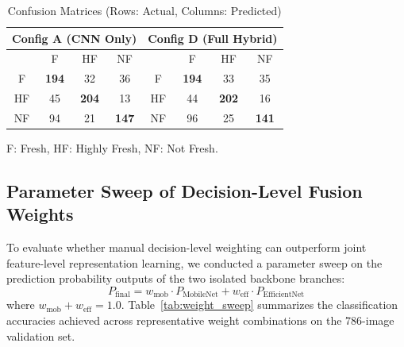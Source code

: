 \documentclass[conference]{IEEEtran}
\begin{document}
\begin{table}[h]
\centering
\caption{Confusion Matrices (Rows: Actual, Columns: Predicted)}
\label{tab:confusion}
\begin{tabular}{c|ccc|c|ccc}
\toprule
\multicolumn{4}{c|}{\textbf{Config A (CNN Only)}} & \multicolumn{4}{c}{\textbf{Config D (Full Hybrid)}} \\
\midrule
& F & HF & NF & & F & HF & NF \\
\midrule
F & \textbf{194} & 32 & 36 & F & \textbf{194} & 33 & 35 \\
HF & 45 & \textbf{204} & 13 & HF & 44 & \textbf{202} & 16 \\
NF & 94 & 21 & \textbf{147} & NF & 96 & 25 & \textbf{141} \\
\bottomrule
\end{tabular}
\vspace{0.1cm}

\scriptsize{F: Fresh, HF: Highly Fresh, NF: Not Fresh.}
\end{table}

\subsection{Parameter Sweep of Decision-Level Fusion Weights}

To evaluate whether manual decision-level weighting can outperform joint feature-level representation learning, we conducted a parameter sweep on the prediction probability outputs of the two isolated backbone branches:
\begin{equation}
P_{\text{final}} = w_{\text{mob}} \cdot P_{\text{MobileNet}} + w_{\text{eff}} \cdot P_{\text{EfficientNet}}
\end{equation}
where $w_{\text{mob}} + w_{\text{eff}} = 1.0$. Table~\ref{tab:weight_sweep} summarizes the classification accuracies achieved across representative weight combinations on the 786-image validation set.
\end{document}
